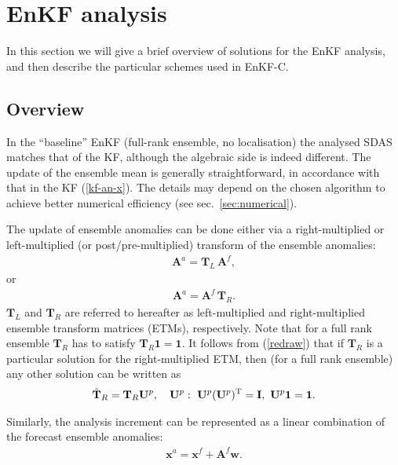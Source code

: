 \documentclass[11pt]{report}
\newcommand{\mb} {\mathbf}
\newcommand{\T}{^{\tiny \mathrm T}}
\begin{document}
\section{EnKF analysis}

In this section we will give a brief overview of solutions for the EnKF analysis, and then describe the particular schemes used in EnKF-C.

\subsection{Overview}

In the ``baseline'' EnKF (full-rank ensemble, no localisation) the analysed SDAS matches that of the KF, although the algebraic side is indeed different.
The update of the ensemble mean is generally straightforward, in accordance with that in the KF (\ref{kf-an-x}).
The details may depend on the chosen algorithm to achieve better numerical efficiency (see sec.~\ref{sec:numerical}).

The update of ensemble anomalies can be done either via a right-multiplied or left-multiplied (or post/pre-multiplied) transform of the ensemble anomalies:
\begin{align}
  \label{T-left}
  \mb A^a = \mb T_L \,\mb A^f,
\end{align}
or
\begin{align}
  \label{T-right}
  \mb A^a = \mb A^f \, \mb T_R.
\end{align}
$\mb T_L$ and $\mb T_R$ are referred to hereafter as left-multiplied and right-multiplied ensemble transform matrices (ETMs), respectively.
Note that for a full rank ensemble $\mb T_R$ has to satisfy $\mb T_R \mb 1 = \mb 1$.
It follows from (\ref{redraw}) that if $\mb T_R$ is a particular solution for the right-multiplied ETM, then (for a full rank ensemble) any other solution can be written as
\begin{align}
  \label{TR-all}
  \tilde{\mb T}_R = \mb T_R \mb U^p, \quad \mb U^p:\ \mb U^p (\mb U^p)\T = \mb I,\ \mb U^p \mb 1 = \mb 1.
\end{align}

Similarly, the analysis increment can be represented as a linear combination of the forecast ensemble anomalies:
\begin{align}
  \label{w}
  \mb x^a = \mb x^f + \mb A^f \mb w.
\end{align}
\end{document}
